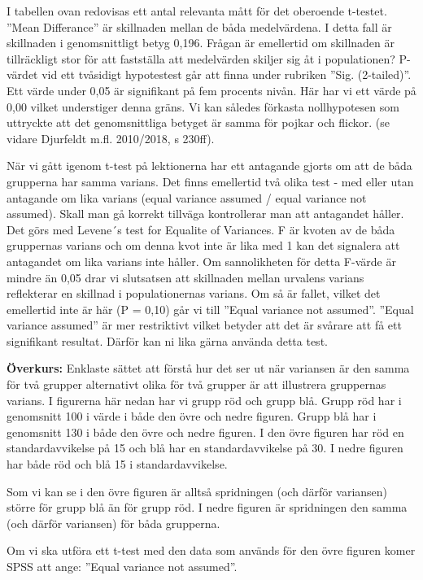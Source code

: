 \documentclass[
]{book}
\begin{document}
I tabellen ovan redovisas ett antal relevanta mått för det oberoende t-testet. ''Mean Differance'' är
skillnaden mellan de båda medelvärdena. I detta fall är skillnaden i genomsnittligt betyg 0,196.
Frågan är emellertid om skillnaden är tillräckligt stor för att fastställa att medelvärden skiljer sig åt i
populationen? P-värdet vid ett tvåsidigt hypotestest går att finna under rubriken ''Sig. (2-tailed)''. Ett
värde under 0,05 är signifikant på fem procents nivån. Här har vi ett värde på 0,00 vilket understiger
denna gräns. Vi kan således förkasta nollhypotesen som uttryckte att det genomsnittliga betyget är
samma för pojkar och flickor. (se vidare Djurfeldt m.fl. 2010/2018, s 230ff).

När vi gått igenom t-test på lektionerna har ett antagande gjorts om att de båda grupperna har samma
varians. Det finns emellertid två olika test - med eller utan antagande om lika varians (equal variance
assumed / equal variance not assumed). Skall man gå korrekt tillväga kontrollerar man att antagandet
håller. Det görs med Levene´s test for Equalite of Variances. F är kvoten av de båda gruppernas varians
och om denna kvot inte är lika med 1 kan det signalera att antagandet om lika varians inte håller. Om
sannolikheten för detta F-värde är mindre än 0,05 drar vi slutsatsen att skillnaden mellan urvalens
varians reflekterar en skillnad i populationernas varians. Om så är fallet, vilket det emellertid inte är här (P = 0,10) går vi till ''Equal variance not assumed''. ''Equal variance assumed'' är mer restriktivt vilket
betyder att det är svårare att få ett signifikant resultat. Därför kan ni lika gärna använda detta test.

\textbf{Överkurs:} Enklaste sättet att förstå hur det ser ut när variansen är den samma för två grupper alternativt olika för två grupper är att illustrera gruppernas varians. I figurerna här nedan har vi grupp röd och grupp blå. Grupp röd har i genomsnitt 100 i värde i både den övre och nedre figuren. Grupp blå har i genomsnitt 130 i både den övre och nedre figuren. I den övre figuren har röd en standardavvikelse på 15 och blå har en standardavvikelse på 30. I nedre figuren har både röd och blå 15 i standardavvikelse.

Som vi kan se i den övre figuren är alltså spridningen (och därför variansen) större för grupp blå än för grupp röd. I nedre figuren är spridningen den samma (och därför variansen) för båda grupperna.

Om vi ska utföra ett t-test med den data som används för den övre figuren komer SPSS att ange: ''Equal variance not assumed''.
\end{document}
